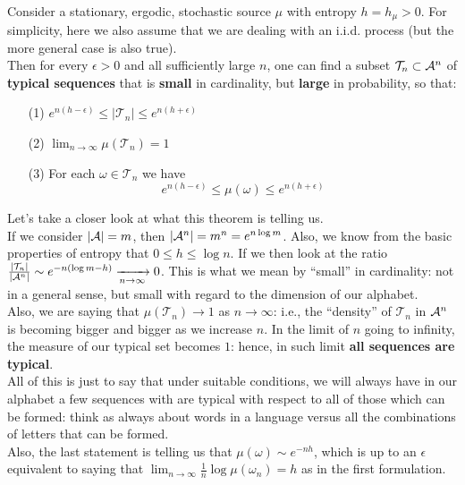\begin{theorem}
\label{th:SMB}
    \hfill \\
    Consider a stationary, ergodic, stochastic source $\mu$ with entropy $h = h_\mu > 0$. For simplicity, here we also assume that we are dealing with an i.i.d. process (but the more general case is also true).
    \\Then for every $\epsilon>0$ and all sufficiently large $n$, one can find a subset $\mathcal{T}_n \subset \mathcal{A}^n$ of \textbf{typical sequences} that is \textbf{small} in cardinality, but \textbf{large} in probability, so that:
    \begin{itemize}
        \item[(1)] $e^{n (h- \epsilon)} \leq |\mathcal{T}_n| \leq e^{n (h+ \epsilon)}$
        \item[(2)] $\lim_{n \rightarrow \infty} \mu(\mathcal{T}_n) = 1$
        \item[(3)] For each $\omega \in \mathcal{T}_n$ we have
        \begin{equation*}
            e^{n (h- \epsilon)} \leq \mu(\omega) \leq e^{n (h+ \epsilon)}
        \end{equation*}
    \end{itemize}
\end{theorem}
Let's take a closer look at what this theorem is telling us.
\\If we consider $|\mathcal{A}|=m$, then $|\mathcal{A}^n| = m^n = e^{n \log m}$. Also, we know from the basic properties of entropy that $0 \leq h \leq \log n$. If we then look at the ratio $\frac{|\mathcal{T}_n|}{|\mathcal{A}^n|} \sim e^{-n (\log m - h)} \xrightarrow[n \rightarrow \infty]{} 0$. This is what we mean by ``small'' in cardinality: not in a general sense, but small with regard to the dimension of our alphabet. 
\\Also, we are saying that $\mu(\mathcal{T}_n) \rightarrow 1$ as $n \rightarrow \infty$: i.e., the ``density'' of $\mathcal{T}_n$ in $\mathcal{A}^n$ is becoming bigger and bigger as we increase $n$. In the limit of $n$ going to infinity, the measure of our typical set becomes $1$: hence, in such limit \textbf{all sequences are typical}. 
\\All of this is just to say that under suitable conditions, we will always have in our alphabet a few sequences with are typical with respect to all of those which can be formed: think as always about words in a language versus all the combinations of letters that can be formed. 
\\Also, the last statement is telling us that $\mu(\omega) \sim e^{-n h}$, which is up to an $\epsilon$ equivalent to saying that $\lim_{n \rightarrow \infty} \frac{1}{n} \log \mu(\omega_n) = h$ as in the first formulation.
